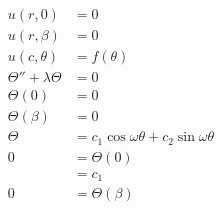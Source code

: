 \documentclass{article}
\begin{document}
\begin{align*}
  u(r, 0)                   & = 0                                                                                                                                                                                               \\
  u(r, \beta)               & = 0                                                                                                                                                                                               \\
  u(c, \theta)              & = f(\theta)                                                                                                                                                                                       \\
  \Theta'' + \lambda \Theta & = 0                                                                                                                                                                                               \\
  \Theta(0)                 & = 0                                                                                                                                                                                               \\
  \Theta(\beta)             & = 0                                                                                                                                                                                               \\
  \Theta                    & = c_1 \cos \omega \theta + c_2 \sin \omega \theta                                                                                                                                                 \\
  0                         & = \Theta(0)                                                                                                                                                                                       \\
                            & = c_1                                                                                                                                                                                             \\
  0                         & = \Theta(\beta)                                                                                                                                                                                   \\

\end{align*}
\end{document}
